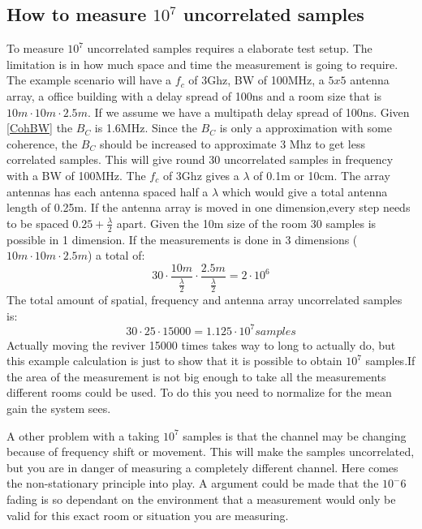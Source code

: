 \subsection{How to measure $10^7$ uncorrelated samples}
To measure $10^7$ uncorrelated samples requires a elaborate test setup. The limitation is in how much space and time the measurement is going to require. The example scenario  will have a $f_c$ of 3Ghz, BW of 100MHz, a $5x5$ antenna array, a office building with a delay spread of 100ns and a room size that is $10m \cdot 10m \cdot 2.5m$.
If we assume we have a multipath delay spread of 100ns. Given \autoref{CohBW} the $B_C$ is 1.6MHz. Since the $B_C$ is only a approximation with some coherence, the $B_C$ should be increased to approximate 3 Mhz to get less correlated samples. This will give round 30 uncorrelated samples in frequency with a BW of 100MHz.
The $f_c$ of 3Ghz gives a $\lambda$ of 0.1m or 10cm. The array antennas has each antenna spaced half a $\lambda$ which would give a total antenna length of 0.25m. If the antenna array is moved in one dimension,every step needs to be spaced $0.25+\frac{\lambda}{2}$ apart. Given the 10m size of the room 30 samples is possible in 1 dimension. If the measurements is done in 3 dimensions ($10m\cdot 10m \cdot 2.5m$) a total of:
\begin{equation}
30 \cdot \frac{10m}{\frac{\lambda}{2}} \cdot \frac{2.5m}{\frac{\lambda}{2}} = 2 \cdot 10^6
\end{equation}
The total amount of spatial, frequency and antenna array uncorrelated samples is:
\begin{equation}
30 \cdot 25 \cdot 15000 = 1.125 \cdot 10^7 samples
\end{equation}
Actually moving the reviver 15000 times takes way to long to actually do, but this example calculation is just to show that it is possible to obtain $10^7$ samples.If the area of the measurement is not big enough to take all the measurements different rooms could be used. To do this you need to normalize for the mean gain the system sees. 

A other problem with a taking $10^7$ samples is that the channel may be changing because of frequency shift or movement. This will make the samples uncorrelated, but you are in danger of measuring a completely different channel. Here comes the non-stationary principle into play. A argument could be made that the $10^-6$ fading is so dependant on the environment that a measurement would only be valid for this exact room or situation you are measuring.


